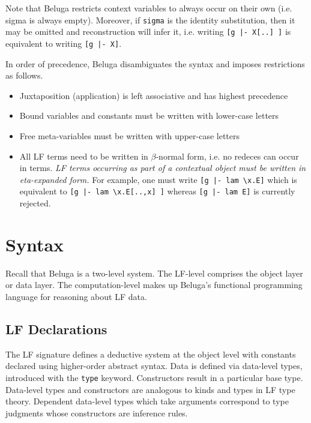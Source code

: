 \documentclass[11pt]{article}
\begin{document}
Note that Beluga restricts context variables to always occur on their own (i.e. sigma is always empty).
Moreover, if \verb+sigma+ is the identity substitution, then it may be omitted and reconstruction will infer it, i.e. writing \verb+[g |- X[..] ]+ is equivalent to writing \verb+[g |- X]+.

In order of precedence, Beluga disambiguates the syntax and imposes restrictions as follows.
\begin{itemize}
\item Juxtaposition (application) is left associative and has highest precedence
\item Bound variables and constants must be written with lower-case letters
\item Free meta-variables must be written with upper-case letters
\item All LF terms need to be written in $\beta$-normal form, i.e. no redeces can occur in terms. \textit{LF terms occurring as part of a contextual object must be written in eta-expanded form.} For example, one must write \verb+[g |- lam \x.E]+ which is equivalent to
  \verb+[g |- lam \x.E[..,x] ]+ whereas \verb+[g |- lam E]+ is currently rejected.
\end{itemize}


\section{Syntax}

Recall that Beluga is a two-level system.
The LF-level comprises the object layer or data layer.
The computation-level makes up Beluga's functional programming language for reasoning about LF data.

\subsection{LF Declarations}

The LF signature defines a deductive system at the object level with constants declared using higher-order abstract syntax.
Data is defined via data-level types, introduced with the \verb+type+ keyword.
Constructors result in a particular base type.
Data-level types and constructors are analogous to kinds and types in LF type theory.
Dependent data-level types which take arguments correspond to type judgments whose constructors are inference rules.
\end{document}
